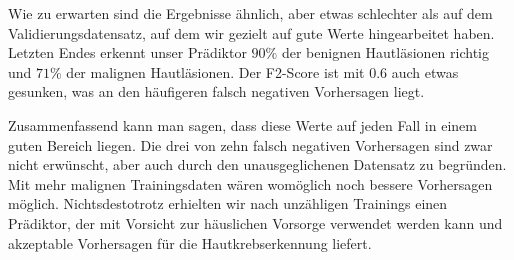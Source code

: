  Wie zu erwarten sind die Ergebnisse ähnlich, aber etwas schlechter als auf dem Validierungsdatensatz, auf dem wir gezielt auf gute Werte hingearbeitet haben. Letzten Endes erkennt unser Prädiktor $90\%$ der benignen Hautläsionen richtig und $71\%$ der malignen Hautläsionen. Der F2-Score ist mit $0.6$ auch etwas gesunken, was an den häufigeren falsch negativen Vorhersagen liegt.

Zusammenfassend kann man sagen, dass diese Werte auf jeden Fall in einem guten Bereich liegen. Die drei von zehn falsch negativen Vorhersagen sind zwar nicht erwünscht, aber auch durch den unausgeglichenen Datensatz zu begründen. Mit mehr malignen Trainingsdaten wären womöglich noch bessere Vorhersagen möglich. Nichtsdestotrotz erhielten wir nach unzähligen Trainings einen Prädiktor, der mit Vorsicht zur häuslichen Vorsorge verwendet werden kann und akzeptable Vorhersagen für die Hautkrebserkennung liefert.


